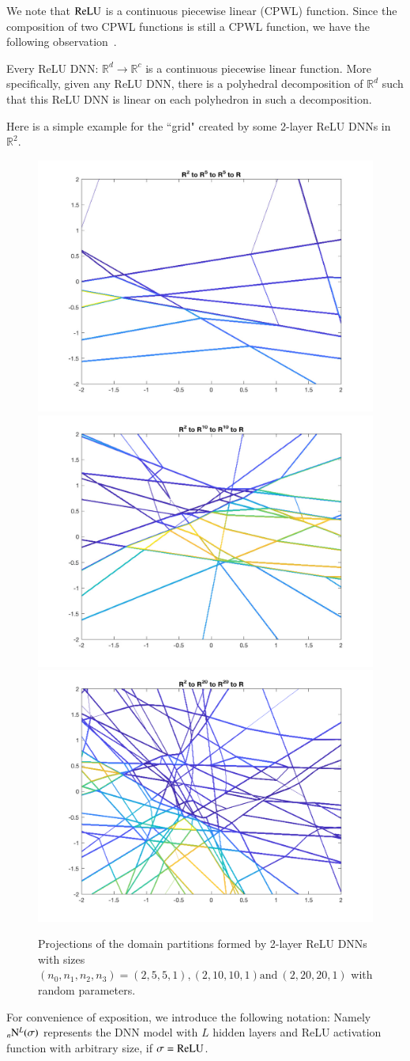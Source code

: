 We note that $\rm ReLU$ is a continuous piecewise linear (CPWL) function.
Since the composition of two CPWL functions is still a CPWL
function, we have the following observation~\cite{arora2016understanding}.
\begin{lemma}\label{dnn-cpwl}
	Every ReLU DNN: $\mathbb{R}^d\to\mathbb{R}^c$ is a continuous
	piecewise linear function.  More specifically, given any ReLU DNN,
	there is a polyhedral decomposition of $\mathbb R^d$ such that this
	ReLU DNN is linear on each polyhedron in such a decomposition.
\end{lemma}

Here is a simple example for the ``grid" created by some 2-layer ReLU DNNs in $\mathbb{R}^2$.

\begin{figure}[ht]
	\includegraphics[width=.3\textwidth]{figures/2to5to5to1-eps-converted-to.pdf}  
	\includegraphics[width=.3\textwidth]{figures/2to10to10to1-eps-converted-to.pdf}  
	\includegraphics[width=.3\textwidth]{figures/2to20to20to1-eps-converted-to.pdf}  
	\caption{Projections of the domain partitions formed by 2-layer ReLU DNNs with sizes $(n_0, n_1, n_2, n_3)= (2, 5, 5, 1), (2, 10, 10, 1) \text{and}\ (2, 20, 20, 1)$ with random parameters.}
	\label{fig:dnn-region}
\end{figure}

For convenience of exposition,  we introduce the following notation:
Namely ${}_n{\rm N}^L({\sigma})$ represents the DNN model with $L$ hidden layers and
ReLU activation function with arbitrary size, if $\sigma = {\rm ReLU}$.

